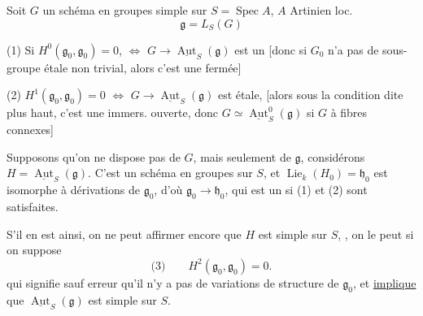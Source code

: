 Soit $G$ un schéma en groupes simple sur $S=\operatorname{Spec}A$, $A$ Artinien loc.
\[
\mathfrak g=L_S(G)
\]

(1) Si $H^0(\mathfrak g_0,\mathfrak g_0)=0$, $\Longleftrightarrow$ $G\to\underline{\operatorname{Aut}}_S(\mathfrak g)$ est un 
[donc si $G_0$ n'a pas de sous-groupe  étale  non trivial, alors c'est une  fermée]

(2)    $H^1(\mathfrak g_0,\mathfrak g_0)=0$ $\Longleftrightarrow$  $G\to\underline{\operatorname{Aut}}_S(\mathfrak g)$ est étale,
[alors sous la condition dite plus haut, c'est une immers. ouverte, donc $G\simeq\underline{\operatorname{Aut}}_S^0(\mathfrak g)$ si $G$ à fibres connexes]


Supposons qu'on ne dispose pas de $G$, mais seulement de $\mathfrak g$, considérons $H=\underline{\operatorname{Aut}}_S(\mathfrak g)$.
 C'est un schéma en groupes sur $S$, et $\operatorname{Lie}_k(H_0)=\mathfrak h_0$ est isomorphe à    dérivations de $\mathfrak g_0$, d'où $\mathfrak g_0\to\mathfrak h_0$, qui est un  si (1) et (2) sont satisfaites.

S'il en est ainsi, on ne peut affirmer encore que $H$ est simple sur $S$, ,  on le peut si on suppose
\[
\text{(3)}\qquad H^2(\mathfrak g_0,\mathfrak g_0)=0.
\]
qui signifie sauf erreur qu'il n'y a pas de variations de structure   de $\mathfrak g_0$, et \uline{implique} que  $\underline{\operatorname{Aut}}_S(\mathfrak g)$ est simple sur $S$.
